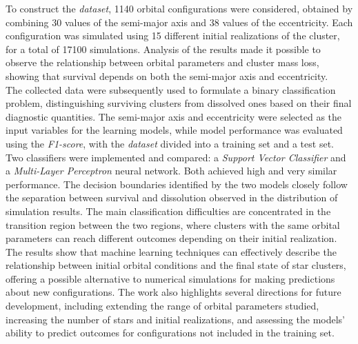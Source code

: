\noindent To construct the \emph{dataset}, 1140 orbital configurations were considered, obtained by combining 30 values of the semi-major axis and 38 values of the eccentricity. Each configuration was simulated using 15 different initial realizations of the cluster, for a total of 17100 simulations. Analysis of the results made it possible to observe the relationship between orbital parameters and cluster mass loss, showing that survival depends on both the semi-major axis and eccentricity.\\ The collected data were subsequently used to formulate a binary classification problem, distinguishing surviving clusters from dissolved ones based on their final diagnostic quantities. The semi-major axis and eccentricity were selected as the input variables for the learning models, while model performance was evaluated using the \emph{F1-score}, with the \emph{dataset} divided into a training set and a test set.\\

\noindent Two classifiers were implemented and compared: a \emph{Support Vector Classifier} and a \emph{Multi-Layer Perceptron} neural network. Both achieved high and very similar performance. The decision boundaries identified by the two models closely follow the separation between survival and dissolution observed in the distribution of simulation results. The main classification difficulties are concentrated in the transition region between the two regions, where clusters with the same orbital parameters can reach different outcomes depending on their initial realization.\\

\noindent The results show that machine learning techniques can effectively describe the relationship between initial orbital conditions and the final state of star clusters, offering a possible alternative to numerical simulations for making predictions about new configurations. The work also highlights several directions for future development, including extending the range of orbital parameters studied, increasing the number of stars and initial realizations, and assessing the models' ability to predict outcomes for configurations not included in the training set.%
